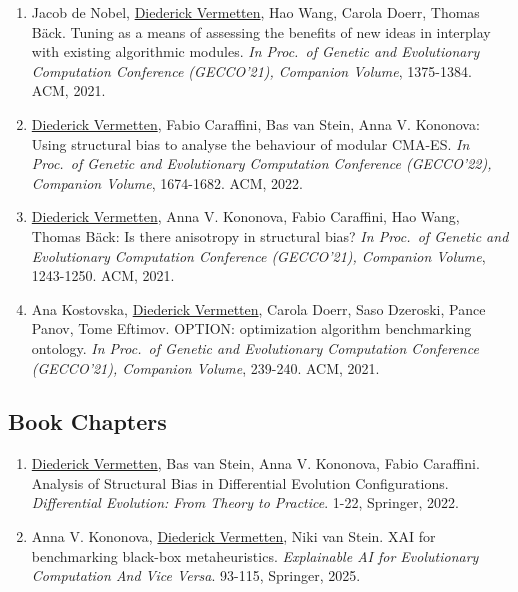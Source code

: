 \begin{enumerate}
    \item Jacob de Nobel, \underline{Diederick Vermetten}, Hao Wang, Carola Doerr, Thomas Bäck. Tuning as a means of assessing the benefits of new ideas in interplay with existing algorithmic modules. 
    \emph{In Proc.~of Genetic and Evolutionary Computation Conference (GECCO'21), Companion Volume}, 1375-1384. ACM, 2021.
    
    \item \underline{Diederick Vermetten}, Fabio Caraffini, Bas van Stein, Anna V. Kononova:
    Using structural bias to analyse the behaviour of modular CMA-ES. 
    \emph{In Proc.~of Genetic and Evolutionary Computation Conference (GECCO'22), Companion Volume}, 1674-1682. ACM, 2022.
    
    \item \underline{Diederick Vermetten}, Anna V. Kononova, Fabio Caraffini, Hao Wang, Thomas Bäck:
    Is there anisotropy in structural bias? 
    \emph{In Proc.~of Genetic and Evolutionary Computation Conference (GECCO'21), Companion Volume}, 1243-1250. ACM, 2021.
    
    \item Ana Kostovska, \underline{Diederick Vermetten}, Carola Doerr, Saso Dzeroski, Pance Panov, Tome Eftimov. OPTION: optimization algorithm benchmarking ontology. 
    \emph{In Proc.~of Genetic and Evolutionary Computation Conference (GECCO'21), Companion Volume}, 239-240. ACM, 2021.
\end{enumerate}

    
\subsection*{Book Chapters}

\begin{enumerate}
    \item  \underline{Diederick Vermetten}, Bas van Stein, Anna V. Kononova, Fabio Caraffini. Analysis of Structural Bias in Differential Evolution Configurations.
    \emph{Differential Evolution: From Theory to Practice}. 1-22, Springer, 2022.
    \item Anna V. Kononova, \underline{Diederick Vermetten}, Niki van Stein. XAI for benchmarking black-box metaheuristics. 
    \emph{Explainable AI for Evolutionary Computation And Vice Versa}. 93-115, Springer, 2025.
\end{enumerate}

